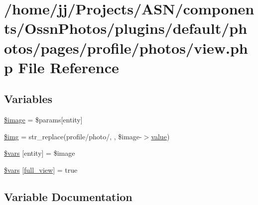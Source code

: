 \hypertarget{components_2_ossn_photos_2plugins_2default_2photos_2pages_2profile_2photos_2view_8php}{}\section{/home/jj/\+Projects/\+A\+S\+N/components/\+Ossn\+Photos/plugins/default/photos/pages/profile/photos/view.php File Reference}
\label{components_2_ossn_photos_2plugins_2default_2photos_2pages_2profile_2photos_2view_8php}
\subsection*{Variables}
\begin{DoxyCompactItemize}
\item 
\hyperlink{components_2_ossn_photos_2plugins_2default_2photos_2pages_2profile_2photos_2view_8php_aac6146b4cdec66c94263ddb55afd5946}{\$image} = \$params\mbox{[}\textquotesingle{}entity\textquotesingle{}\mbox{]}
\item 
\hyperlink{components_2_ossn_photos_2plugins_2default_2photos_2pages_2profile_2photos_2view_8php_a56a9a0da0c26b3d3029cea47a6b9292f}{\$img} = str\+\_\+replace(\textquotesingle{}profile/photo/\textquotesingle{}, \textquotesingle{}\textquotesingle{}, \$image-\/$>$\hyperlink{fullpage_2plugin_8min_8js_ac56c57897e10f699d124e0103921aa20}{value})
\item 
\hyperlink{components_2_ossn_photos_2plugins_2default_2photos_2pages_2profile_2photos_2view_8php_aa07d093940e8b3330058e9f2c4396426}{\$vars} \mbox{[}\textquotesingle{}entity\textquotesingle{}\mbox{]} = \$image
\item 
\hyperlink{components_2_ossn_photos_2plugins_2default_2photos_2pages_2profile_2photos_2view_8php_a06867e093d38c49799871f55ab9ff793}{\$vars} \mbox{[}\textquotesingle{}\hyperlink{components_2_ossn_wall_2plugins_2default_2wall_2pages_2view_8php_a8aa2e512060821710745c7a77b98b65f}{full\+\_\+view}\textquotesingle{}\mbox{]} = true
\end{DoxyCompactItemize}


\subsection{Variable Documentation}
